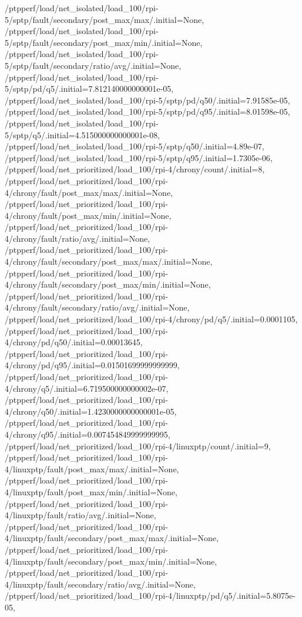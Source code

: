 {    /ptpperf/load/net_isolated/load_100/rpi-5/sptp/fault/secondary/post_max/max/.initial=None,
    /ptpperf/load/net_isolated/load_100/rpi-5/sptp/fault/secondary/post_max/min/.initial=None,
    /ptpperf/load/net_isolated/load_100/rpi-5/sptp/fault/secondary/ratio/avg/.initial=None,
    /ptpperf/load/net_isolated/load_100/rpi-5/sptp/pd/q5/.initial=7.812140000000001e-05,
    /ptpperf/load/net_isolated/load_100/rpi-5/sptp/pd/q50/.initial=7.91585e-05,
    /ptpperf/load/net_isolated/load_100/rpi-5/sptp/pd/q95/.initial=8.01598e-05,
    /ptpperf/load/net_isolated/load_100/rpi-5/sptp/q5/.initial=4.515000000000001e-08,
    /ptpperf/load/net_isolated/load_100/rpi-5/sptp/q50/.initial=4.89e-07,
    /ptpperf/load/net_isolated/load_100/rpi-5/sptp/q95/.initial=1.7305e-06,
    /ptpperf/load/net_prioritized/load_100/rpi-4/chrony/count/.initial=8,
    /ptpperf/load/net_prioritized/load_100/rpi-4/chrony/fault/post_max/max/.initial=None,
    /ptpperf/load/net_prioritized/load_100/rpi-4/chrony/fault/post_max/min/.initial=None,
    /ptpperf/load/net_prioritized/load_100/rpi-4/chrony/fault/ratio/avg/.initial=None,
    /ptpperf/load/net_prioritized/load_100/rpi-4/chrony/fault/secondary/post_max/max/.initial=None,
    /ptpperf/load/net_prioritized/load_100/rpi-4/chrony/fault/secondary/post_max/min/.initial=None,
    /ptpperf/load/net_prioritized/load_100/rpi-4/chrony/fault/secondary/ratio/avg/.initial=None,
    /ptpperf/load/net_prioritized/load_100/rpi-4/chrony/pd/q5/.initial=0.0001105,
    /ptpperf/load/net_prioritized/load_100/rpi-4/chrony/pd/q50/.initial=0.00013645,
    /ptpperf/load/net_prioritized/load_100/rpi-4/chrony/pd/q95/.initial=0.01501699999999999,
    /ptpperf/load/net_prioritized/load_100/rpi-4/chrony/q5/.initial=6.719500000000002e-07,
    /ptpperf/load/net_prioritized/load_100/rpi-4/chrony/q50/.initial=1.4230000000000001e-05,
    /ptpperf/load/net_prioritized/load_100/rpi-4/chrony/q95/.initial=0.007454849999999995,
    /ptpperf/load/net_prioritized/load_100/rpi-4/linuxptp/count/.initial=9,
    /ptpperf/load/net_prioritized/load_100/rpi-4/linuxptp/fault/post_max/max/.initial=None,
    /ptpperf/load/net_prioritized/load_100/rpi-4/linuxptp/fault/post_max/min/.initial=None,
    /ptpperf/load/net_prioritized/load_100/rpi-4/linuxptp/fault/ratio/avg/.initial=None,
    /ptpperf/load/net_prioritized/load_100/rpi-4/linuxptp/fault/secondary/post_max/max/.initial=None,
    /ptpperf/load/net_prioritized/load_100/rpi-4/linuxptp/fault/secondary/post_max/min/.initial=None,
    /ptpperf/load/net_prioritized/load_100/rpi-4/linuxptp/fault/secondary/ratio/avg/.initial=None,
    /ptpperf/load/net_prioritized/load_100/rpi-4/linuxptp/pd/q5/.initial=5.8075e-05,
}
